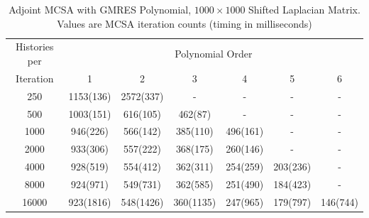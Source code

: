 \documentclass[10pt]{article}
\begin{document}
\begin{table}
\caption{Adjoint MCSA with GMRES Polynomial, $1000 \times 1000$ Shifted Laplacian Matrix.
Values are MCSA iteration counts (timing in milliseconds)
\label{tab:lap_adjoint_gmres}}
\centering
\begin{tabular}{ccccccc}
\toprule
Histories per & \multicolumn{6}{c}{Polynomial Order} \\
Iteration & 1 & 2 & 3 & 4 & 5 & 6 \\
\midrule
250 & 1153(136) & 2572(337) & - & - & - & - \\
500 & 1003(151) & 616(105) & 462(87) & - & - & - \\
1000 & 946(226) & 566(142) & 385(110) & 496(161) & - & - \\
2000 & 933(306) & 557(222) & 368(175) & 260(146) & - & - \\
4000 & 928(519) & 554(412) & 362(311) & 254(259) & 203(236) & - \\
8000 & 924(971) & 549(731) & 362(585) & 251(490) & 184(423) & - \\
16000 & 923(1816) & 548(1426) & 360(1135) & 247(965) & 179(797) & 146(744) \\
\bottomrule
\end{tabular}
\end{table}



\end{document}
